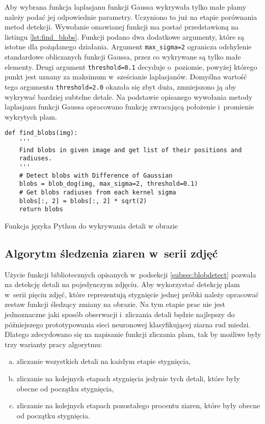 Aby wybrana funkcja laplasjanu funkcji Gaussa wykrywała tylko małe plamy
należy podać jej odpowiednie parametry.
Uczyniono to już na etapie porównania metod detekcji.
Wywołanie omawianej funkcji ma postać przedstawioną na listingu
\ref{lst:find_blobs}.
Funkcji podano dwa dodatkowe argumenty, które są istotne dla pożądanego
działania.
Argument \texttt{max_sigma=2} ogranicza odchylenie standardowe
obliczanych funkcji Gaussa, przez co wykrywane są tylko małe elementy.
Drugi argument \texttt{threshold=0.1} decyduje o~poziomie,
powyżej którego punkt jest uznany za maksimum w~sześcianie laplasjanów.
Domyślna wartość tego argumentu \texttt{threshold=2.0} okazała 
się zbyt duża, zmniejszono ją aby wykrywać bardziej subtelne detale.
Na podstawie opisanego wywołania metody laplasjanu funkcji Gaussa
opracowano funkcję zwracającą położenie i~promienie wykrytych plam.
\begin{listing}[htb]
\begin{verbatim}
def find_blobs(img):
    '''
    Find blobs in given image and get list of their positions and 
    radiuses.
    '''
    # Detect blobs with Difference of Gaussian
    blobs = blob_dog(img, max_sigma=2, threshold=0.1)
    # Get blobs radiuses from each kernel sigma
    blobs[:, 2] = blobs[:, 2] * sqrt(2)
    return blobs
\end{verbatim}
\caption{Funkcja języka Python do wykrywania detali w obrazie}
\label{lst:find_blobs}
\end{listing}

\subsection{Algorytm śledzenia ziaren w~serii zdjęć}
\label{subsec:blobtracking}
Użycie funkcji bibliotecznych opisanych w~podsekcji \ref{subsec:blobdetect}
pozwala na detekcję detali na pojedynczym zdjęciu.
Aby wykorzystać detekcję plam w~serii pięciu zdjęć, które reprezentują
stygnięcie jednej próbki należy opracować zestaw funkcji śledzący zmiany 
na obrazie.
Na tym etapie prac nie jest jednoznaczne jaki sposób obserwacji i~zliczania
detali będzie najlepszy do późniejszego prototypowania sieci neuronowej
klasyfikującej ziarna rud miedzi.
Dlatego zdecydowano się na napisanie funkcji zliczania plam, tak by
możliwe były trzy warianty pracy algorytmu:
\begin{enumerate}[a)]
	\item \label{it:allblob}
	      zliczanie wszystkich detali na każdym etapie stygnięcia,
	\item \label{it:remainingblob}
	      zliczanie na kolejnych etapach stygnięcia jedynie tych detali,
	      które były obecne od początku stygnięcia,
	\item \label{it:percentblob}
	      zliczanie na kolejnych etapach pozostałego procentu ziaren, które
	      były obecne od początku stygnięcia.
\end{enumerate}

